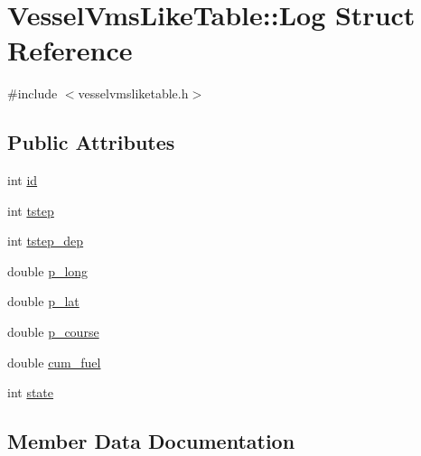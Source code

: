 \hypertarget{struct_vessel_vms_like_table_1_1_log}{}\section{Vessel\+Vms\+Like\+Table\+::Log Struct Reference}
\label{struct_vessel_vms_like_table_1_1_log}


{\ttfamily \#include $<$vesselvmsliketable.\+h$>$}

\subsection*{Public Attributes}
\begin{DoxyCompactItemize}
\item 
int \mbox{\hyperlink{struct_vessel_vms_like_table_1_1_log_ad6d04de5bbc7155afb92039126664f77}{id}}
\item 
int \mbox{\hyperlink{struct_vessel_vms_like_table_1_1_log_ac8140aac46431bb541dfcd0fb0c7fd3e}{tstep}}
\item 
int \mbox{\hyperlink{struct_vessel_vms_like_table_1_1_log_ae0a2f6dc4f239d36165d71fe987be492}{tstep\+\_\+dep}}
\item 
double \mbox{\hyperlink{struct_vessel_vms_like_table_1_1_log_adbdc0f25f50d6f524be46fab641ced8b}{p\+\_\+long}}
\item 
double \mbox{\hyperlink{struct_vessel_vms_like_table_1_1_log_a900c4560b13d089279a7eff06005321f}{p\+\_\+lat}}
\item 
double \mbox{\hyperlink{struct_vessel_vms_like_table_1_1_log_ae5bb5c63ff66debef0a754e44f427454}{p\+\_\+course}}
\item 
double \mbox{\hyperlink{struct_vessel_vms_like_table_1_1_log_ac976a7e9ea8add3a53d14bf68416ca76}{cum\+\_\+fuel}}
\item 
int \mbox{\hyperlink{struct_vessel_vms_like_table_1_1_log_a6bea87702549db6b4186fb2170c7dea5}{state}}
\end{DoxyCompactItemize}


\subsection{Member Data Documentation}
\mbox{\label{struct_vessel_vms_like_table_1_1_log_ac976a7e9ea8add3a53d14bf68416ca76}} 

